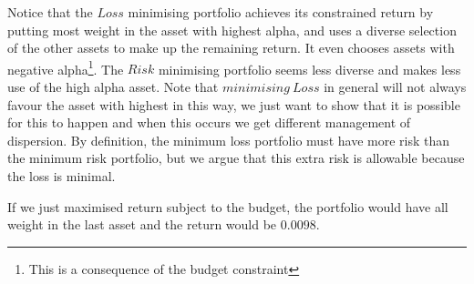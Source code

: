\documentclass[12pt]{article}
\begin{document}
\break
Notice that the $Loss$ minimising portfolio achieves its constrained return by putting most weight in the
asset with highest alpha, and uses a diverse selection of the other assets to make up the remaining 
return. It even chooses assets with negative alpha\footnote{This is a consequence of the budget constraint}. 
The $Risk$ minimising portfolio seems less diverse and makes less use of the high alpha asset.
Note that $minimising\ Loss$ in general will not always favour the asset with highest in this way, we just want 
to show that it is possible for this to happen and when this occurs we get different management of dispersion. 
By definition, the minimum loss 
portfolio must have more risk than the minimum risk portfolio, but we argue that this extra risk is allowable 
because the loss is minimal.

If we just maximised return subject to the budget, the portfolio would have all weight in the last 
asset and the return would be $0.0098$.
\end{document}
